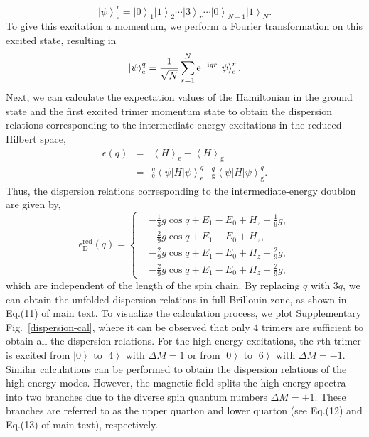 \documentclass[aps,prx,showpacs,floatfix,twocolumn,superscriptaddress,nofootinbib,longbibliography]{revtex4-2}
\begin{document}
  \begin{equation}
	  \left| {\psi}\right\rangle_{\mathrm{e}}^r=\left| {0}\right\rangle_1 \left| {1}\right\rangle_2 \cdots  \left| {3}\right\rangle_r\cdots \left| {0}\right\rangle_{N-1} \left| {1}\right\rangle_{N}.
  \end{equation}
  To give this excitation a momentum, we perform a Fourier transformation on this excited state, resulting in 
  \begin{equation}
	  \left| {\psi }\right\rangle_{\mathrm{e}}^q=\frac{1}{\sqrt{N}} \sum_{r=1}^{N} \mathrm{e}^{-\mathrm{i} \emph{q} \emph{r}} \left| {\psi}\right\rangle_{\mathrm{e}}^r.
  \end{equation}
  Next, we can calculate the expectation values of the Hamiltonian in the ground state and the first excited trimer momentum state to obtain the dispersion relations corresponding to the intermediate-energy excitations in the reduced Hilbert space,
  \begin{eqnarray}
	  \epsilon(q)&=&\left\langle H \right\rangle_{\mathrm{e}} - \left\langle H \right\rangle_{\mathrm{g}} \nonumber \\
	  &=& ^{q}_{\mathrm{e}}\left\langle \psi\right|H \left| \psi\right\rangle^{q}_{\mathrm{e}} -^{q}_{\mathrm{g}}\left\langle \psi\right|H \left| \psi\right\rangle^{q}_{\mathrm{g}}.
  \end{eqnarray}
  Thus, the dispersion relations corresponding to the intermediate-energy doublon are given by,
  \begin{equation}
	  \epsilon_{\mathrm{D}}^{\mathrm{red}} (q)=\left\{
	  \begin{split}
  & -  \frac{1}{3} g \cos{q}+E_1 -E_0 + H_z - \frac{1}{9}g,\\
  & - \frac{2}{9} g \cos{q}+E_1 -E_0 + H_z,\\
  & - \frac{2}{9} g \cos{q}+E_1 -E_0 + H_z + \frac{2}{9}g,\\
  & - \frac{2}{9} g \cos{q}+E_1-E_0  + H_z + \frac{2}{9}g, 
	  \end{split}
   \right.
  \end{equation}
  which are independent of the length of the spin chain.
  By replacing $q$  with $3q$, we can obtain the unfolded dispersion relations in full Brillouin zone, as shown in Eq.(11) of main text.
  To visualize the calculation process, we plot Supplementary Fig.~\ref{dispersion-cal}, where it can be observed that only $4$ trimers are sufficient to obtain all the dispersion relations. 
  For the high-energy excitations, the $r$th trimer is excited 
  from $\left|0\right\rangle$ to $\left|4\right\rangle$ with $\Delta M =1$ or  from $\left|0\right\rangle$ to $\left|6\right\rangle$ with $\Delta M =-1$. Similar calculations can be performed to obtain the dispersion relations of the high-energy modes. However, the magnetic field splits the  high-energy spectra into two branches due to the diverse spin quantum numbers $\Delta M = \pm 1$.  These branches are  referred to as  the upper quarton and lower quarton (see Eq.(12) and Eq.(13) of main text), respectively. 
  
\end{document}
